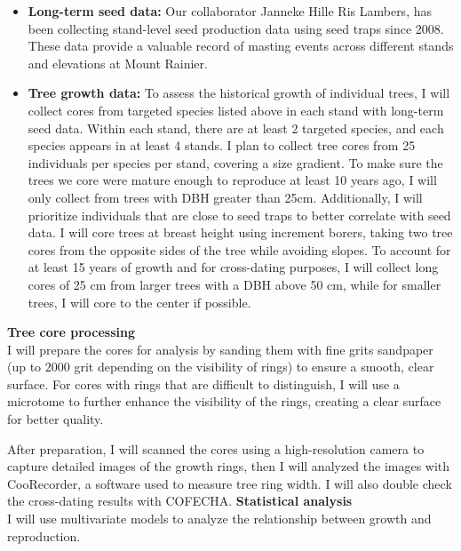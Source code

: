 \documentclass[11pt,letter]{article}
\begin{document}
\begin{itemize}
	\item \textbf{Long-term seed data:} Our collaborator Janneke Hille Ris Lambers, has been collecting stand-level seed production data using seed traps since 2008. These data provide a valuable record of masting events across different stands and elevations at Mount Rainier.
	\item \textbf{Tree growth data:}  To assess the historical growth of individual trees, I will collect cores from targeted species listed above in each stand with long-term seed data. Within each stand, there are at least 2 targeted species, and each species appears in at least 4 stands. I plan to collect tree cores from 25 individuals per species per stand, covering a size gradient. To make sure the trees we core were mature enough to reproduce at least 10 years ago, I will only collect from trees with DBH greater than 25cm. Additionally, I will prioritize individuals that are close to seed traps to better correlate with seed data. I will core trees at breast height using increment borers, taking two tree cores from the opposite sides of the tree while avoiding slopes. To account for at least 15 years of growth and for cross-dating purposes, I will collect long cores of 25 cm from larger trees with a DBH above 50 cm, while for smaller trees, I will core to the center if possible.
	\end{itemize}
\textbf{Tree core processing}\\
I will prepare the cores for analysis by sanding them with fine grits sandpaper (up to 2000 grit depending on the visibility of rings) to ensure a smooth, clear surface. For cores with rings that are difficult to distinguish, I will use a microtome to further enhance the visibility of the rings, creating a clear surface for better quality.\par
After preparation, I will scanned the cores using a high-resolution camera to capture detailed images of the growth rings, then I will analyzed the images with CooRecorder, a software used to measure tree ring width. I will also double check the cross-dating results with COFECHA.
\textbf{Statistical analysis}\\
I will use multivariate models to analyze the relationship between growth and reproduction.
\end{document}
